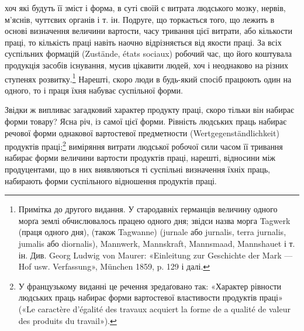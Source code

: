 \parcont{}  %
хоч які будуть її зміст і форма, в суті своїй є витрата людського
мозку, нервів, м’яснів, чуттєвих органів і т. ін. Подруге, що торкається
того, що лежить в основі визначення величини вартости,
часу тривання цієї витрати, або кількости праці, то кількість
праці навіть наочно відрізняється від якости праці. За всіх суспільних
формацій (Zustände, états sociaux) робочий час, що його
коштувала продукція засобів існування, мусив цікавити людей,
хоч і неоднаково на різних ступенях розвитку.\footnote{
Примітка до другого видання. У стародавніх германців величину
одного морґа землі обчислювалось працею одного дня; звідси назва морга
Tagwerk (праця одного дня), (також Tagwanne) (jurnale або jurnalis,
terra jurnalis, jumalis або diornalis), Mannwerk, Mannskraft, Mannsmaad,
Mannshauet і т. ін. Див. Georg Ludwig von Maurer: «Einleitung zur Geschichte
der Mark — Hof usw. Verfassung», München 1859, p. 129 і далі.
} Нарешті, скоро
люди в будь-який спосіб працюють один на одного, то і праця
їхня набуває суспільної форми.

Звідки ж випливає загадковий характер продукту праці,
скоро тільки він набирає форми товару? Ясна річ, із самої цієї
форми. Рівність людських праць набирає речової форми однакової
вартостевої предметности (Wertgegenständlichkeit) продуктів
праці;\footnote*{
У французькому виданні це речення зредаґовано так: «Характер
рівности людських праць набирає форми вартостевої властивости продуктів
праці» («Le caractère d’égalité des travaux acquiert la forme de
a qualité de valeur des produits du travail»).
} виміряння витрати людської робочої сили часом її тривання
набирає форми величини вартости продуктів праці, нарешті,
відносини між продуцентами, що в них виявляються ті
суспільні визначення їхніх праць, набирають форми суспільного
відношення продуктів праці.

